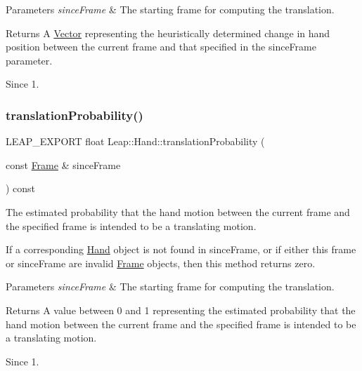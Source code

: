 \begin{DoxyParams}{Parameters}
{\em since\+Frame} & The starting frame for computing the translation. \\
\hline
\end{DoxyParams}
\begin{DoxyReturn}{Returns}
A \hyperlink{struct_leap_1_1_vector}{Vector} representing the heuristically determined change in hand position between the current frame and that specified in the since\+Frame parameter. 
\end{DoxyReturn}
\begin{DoxySince}{Since}
1. 
\end{DoxySince}
\mbox{\label{class_leap_1_1_hand_a11543de2538fba2e3f15aa422dd5b892}} 
\subsubsection{\texorpdfstring{translation\+Probability()}{translationProbability()}}
{\footnotesize\ttfamily L\+E\+A\+P\+\_\+\+E\+X\+P\+O\+RT float Leap\+::\+Hand\+::translation\+Probability (\begin{DoxyParamCaption}\item[{const \hyperlink{class_leap_1_1_frame}{Frame} \&}]{since\+Frame }\end{DoxyParamCaption}) const}

The estimated probability that the hand motion between the current frame and the specified frame is intended to be a translating motion.


\begin{DoxyCodeInclude}
\end{DoxyCodeInclude}


If a corresponding \hyperlink{class_leap_1_1_hand}{Hand} object is not found in since\+Frame, or if either this frame or since\+Frame are invalid \hyperlink{class_leap_1_1_frame}{Frame} objects, then this method returns zero.


\begin{DoxyParams}{Parameters}
{\em since\+Frame} & The starting frame for computing the translation. \\
\hline
\end{DoxyParams}
\begin{DoxyReturn}{Returns}
A value between 0 and 1 representing the estimated probability that the hand motion between the current frame and the specified frame is intended to be a translating motion. 
\end{DoxyReturn}
\begin{DoxySince}{Since}
1. 
\end{DoxySince}
\mbox{\label{class_leap_1_1_hand_a6b5b9a08f5fe21d3eb1b1ab43dcec817}} 

